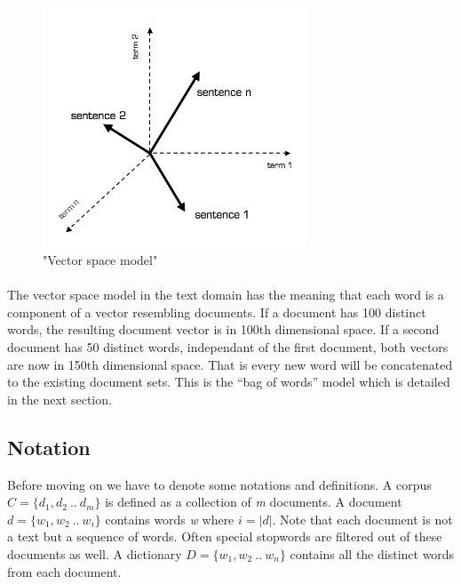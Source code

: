   \begin{figure}[h!]
    \centering
      \includegraphics[width=0.7\textwidth]{vsm.png}
      \caption{"Vector space model"}
      \label{vsm_pic}
  \end{figure}

  \paragraph{}
    The vector space model in the text domain has the meaning that each word is a component of a vector resembling documents. If a document has 100 distinct words, the resulting document vector is in 100th dimensional space. If a second document has 50 distinct words, independant of the first document, both vectors are now in 150th dimensional space. That is every new word will be concatenated to the existing document sets. This is the ``bag of words'' model which is detailed in the next section.

  \subsection{Notation}
    Before moving on we have to denote some notations and definitions. 
    A corpus $C = \{d_1, d_2 \: .. \: d_m\}$ is defined as a collection of \emph{m} documents. A document $d = \{w_1, w_2 \: .. \: w_i\}$ contains words \emph{w} where $i = |d|$. Note that each document is not a text but a sequence of words. Often special stopwords are filtered out of these documents as well. A dictionary $D = \{w_1, w_2 \: .. \: w_n\}$ contains all the distinct words from each document.

